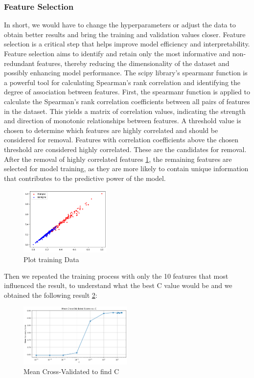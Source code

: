 \documentclass[12pt,a4paper,twocolumn]{article}
\begin{document}
\subsubsection{Feature Selection}
In short, we would have to change the hyperparameters or adjust the data to obtain better results and bring the training and validation values closer.
Feature selection is a critical step that helps improve model efficiency and interpretability. Feature selection aims to identify and retain only the most informative and non-redundant features, thereby reducing the dimensionality of the dataset and possibly enhancing model performance.
The scipy library's spearmanr function is a powerful tool for calculating Spearman's rank correlation and identifying the degree of association between features.
First, the spearmanr function is applied to calculate the Spearman's rank correlation coefficients between all pairs of features in the dataset. This yields a matrix of correlation values, indicating the strength and direction of monotonic relationships between features. A threshold value is chosen to determine which features are highly correlated and should be considered for removal. Features with correlation coefficients above the chosen threshold are considered highly correlated. These are the candidates for removal. After the removal of highly correlated features \ref{fig:DataRed}, the remaining features are selected for model training, as they are more likely to contain unique information that contributes to the predictive power of the model.
\begin{figure}[H]

\includegraphics[width=0.4\textwidth]{images/plotData.png}
\centering
\caption{\label{fig:DataRed} Plot training Data}
\end{figure}

Then we repeated the training process with only the 10 features that most influenced the result, to understand what the best C value would be and we obtained the following result \ref{fig:SecondC}:

\begin{figure}[H]
\includegraphics[width=0.5\textwidth]{images/CEvolFinal.png}
\centering
\caption{\label{fig:SecondC} Mean Cross-Validated to find C}
\end{figure}
\end{document}
